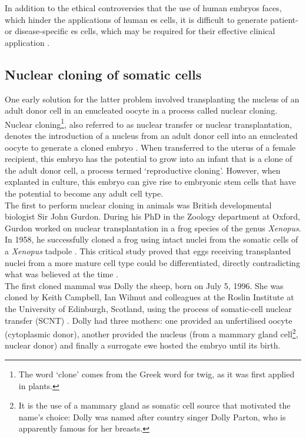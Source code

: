 In addition to the ethical controversies that the use of human embryos faces, which hinder the applications of human \gls{es} cells,
it is difficult to generate patient- or disease-specific \gls{es} cells, which may be required for their effective clinical application \cite{yamanaka2007strategies}.

\newpage

\subsection{Nuclear cloning of somatic cells}
\label{sec:cloning} 
One early solution for the latter problem involved transplanting the nucleus of an adult donor cell in an enucleated oocyte in a process called nuclear cloning. \\

Nuclear cloning\footnote{The word `clone' comes from the Greek word for twig, as it was first applied in plants.}, also referred to as nuclear transfer or nuclear transplantation, denotes the introduction of a nucleus from an adult donor cell into an enucleated oocyte to generate a cloned embryo \cite{hochedlinger2003nuclear}.
When transferred to the uterus of a female recipient, this embryo has the potential to grow into an infant that is a clone of the adult donor cell, a process termed `reproductive cloning'. 
However, when explanted in culture, this embryo can give rise to embryonic stem cells that have the potential to become any adult cell type.\\

The first to perform nuclear cloning in animals was British developmental biologist Sir John Gurdon. 
During his PhD in the Zoology department at Oxford, Gurdon worked on nuclear transplantation in a frog species of the genus \textit{Xenopus}.
In 1958, he successfully cloned a frog using intact nuclei from the somatic cells of a \textit{Xenopus} tadpole \cite{gurdon1962developmental}.
This critical study proved that eggs receiving transplanted nuclei from a more mature cell type could be differentiated, directly contradicting what was believed at the time \cite{king1955changes}. \\

The first cloned mammal was Dolly the sheep, born on July 5, 1996.
She was cloned by Keith Campbell, Ian Wilmut and colleagues at the Roslin Institute at the University of Edinburgh, Scotland, using the process of 
somatic-cell nuclear transfer (SCNT)
\cite{wilmut1997viable}.
Dolly had three mothers: one provided an unfertilised oocyte (cytoplasmic donor), another provided the nucleus (from a mammary gland cell\footnote{It is the use of a mammary gland as somatic cell source that motivated the name's choice: Dolly was named after country singer Dolly Parton, who is apparently famous for her breasts.}, nuclear donor) and finally a surrogate ewe hosted the embryo until its birth.\\

